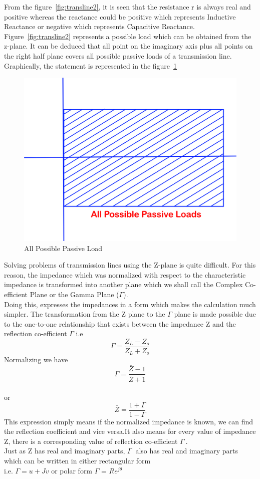 From the figure~\ref{fig:transline2}, it is seen that the resistance r is always real and positive whereas the reactance could be positive which represents Inductive Reactance or negative which represents Capacitive Reactance.\\
Figure~\ref{fig:transline2} represents a possible load which can be obtained from the z-plane.  It can be deduced that all point on the imaginary axis plus all points on the right half plane covers all possible passive loads of a transmission line.
Graphically, the statement is represented in the figure~\ref{fig:oigvbnkliu}
\begin{figure}[h]
\centering
\includegraphics[width=0.6\linewidth]{./graphics/oigvbnkliu}
\caption{All Possible Passive Load}
\label{fig:oigvbnkliu}
\end{figure}

Solving problems of transmission lines using the Z-plane is quite difficult. For this reason, the impedance which was normalized with respect to the characteristic impedance is transformed into another plane which we shall call the Complex Co-efficient Plane or the Gamma Plane ($ \Gamma $).\\ Doing this, expresses the impedances in a form which makes the calculation much simpler.
The transformation from the Z plane to the $ \Gamma $ plane is made possible due to the one-to-one relationship that exists between the impedance Z and the reflection co-efficient $ \Gamma $ i.e
\begin{equation*}
\Gamma = \frac{Z_L - Z_o}{Z_L + Z_o}
\end{equation*}
Normalizing we have
\begin{equation*}
\Gamma= \frac{\bar{Z} - 1}{\bar{Z} + 1}
\end{equation*}\\ or
\begin{equation*}
\bar{Z}= \frac{1 + \Gamma}{1 - \Gamma}
\end{equation*}
This expression simply means if the normalized impedance is known, we can find the reflection coefficient and vice versa.It also means for every value of impedance Z, there is a corresponding value of reflection co-efficient $ \Gamma\ $.\\
Just as Z has real and imaginary parts, $ \Gamma\ $ also has real and imaginary parts which can be written in either rectangular form\\
i.e. $ \Gamma = u + Jv$ or polar form	$\Gamma$ = $Re^{j\theta}$

